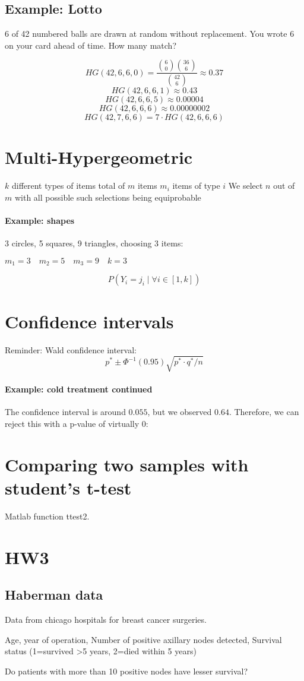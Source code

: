 \documentclass[a4paper]{article}
\begin{document}
\subsection{Example: Lotto}

6 of 42 numbered balls are drawn at random without replacement.
You wrote 6 on your card ahead of time.
How many match?

\[HG(42,6,6,0) = \frac{\binom{6}{0}\binom{36}{6}}{\binom{42}{6}} \approx 0.37\]
\[HG(42,6,6,1) \approx 0.43\]
\[HG(42,6,6,5) \approx 0.00004\]
\[HG(42,6,6,6) \approx 0.00000002\]
\[HG(42,7,6,6) = 7 \cdot HG(42,6,6,6)\]

\section{Multi-Hypergeometric}
$k$ different types of items
total of $m$ items
$m_i$ items of type $i$
We select $n$ out of $m$ with all possible such selections being equiprobable

\paragraph{Example: shapes}

3 circles, 5 squares, 9 triangles, choosing 3 items:

$m_1=3 \quad m_2=5 \quad m_3=9 \quad k=3$

\[P(Y_i=j_i \;|\; \forall i \in [1,k])\]

\section{Confidence intervals}

Reminder: Wald confidence interval:
\[ p^* \pm \Phi^{-1} (0.95)\sqrt{p^* \cdot q^* / n} \]

\paragraph{Example: cold treatment continued}
The confidence interval is around $0.055$, but we observed $0.64$. Therefore, we can reject this with a p-value of virtually 0:


\section{Comparing two samples with student's t-test}
Matlab function ttest2.

\section{HW3}

\subsection{Haberman data}
Data from chicago hospitals for breast cancer surgeries.

Age, year of operation, Number of positive axillary nodes detected, Survival status (1=survived >5 years, 2=died within 5 years)

Do patients with more than 10 positive nodes have lesser survival?
\end{document}
